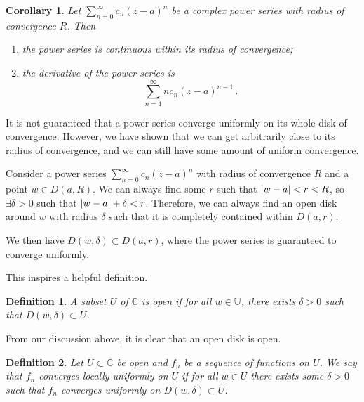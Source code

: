 \documentclass{article}
\theoremstyle{plain}\theoremheaderfont{\normalfont\itshape}\theorembodyfont{\rmfamily}\theoremseparator{.}\newtheorem*{rem}{Remark}\newtheorem*{ex}{Example}\newtheorem*{proof}{Proof}\newtheorem*{altp}{Alternative proof}
\theoremstyle{plain}\theoremheaderfont{\normalfont\bfseries}\theorembodyfont{\rmfamily}\theoremseparator{.}\newtheorem{thm}{Theorem}[section]\newtheorem{lem}[thm]{Lemma}\newtheorem{prop}[thm]{Proposition}\newtheorem*{cor}{Corollary}\newtheorem{defn}[thm]{Definition}\newtheorem{clm}[thm]{Claim}\newtheorem{clminproof}{Claim}
\theoremstyle{break}\theoremheaderfont{\normalfont\itshape}\theorembodyfont{\rmfamily}\theoremseparator{.\medskip}\newtheorem*{proofskip}{Proof}\newtheorem*{exs}{Examples}\newtheorem*{rems}{Remarks}
\theoremstyle{break}\theoremheaderfont{\normalfont\bfseries}\theorembodyfont{\rmfamily}\theoremseparator{.\medskip}\newtheorem{lemskip}[thm]{Lemma}\newtheorem{defnskip}[thm]{Definition}\newtheorem{propskip}[thm]{Proposition}\newtheorem{thmskip}[thm]{Theorem}
\begin{document}
    \begin{cor}
        Let \(\sum_{n=0}^{\infty}c_n(z-a)^n\) be a complex power series with radius of convergence \(R\). Then
        \begin{enumerate}[topsep=0pt,label=(\roman*)]
            \item the power series is continuous within its radius of convergence;
            \item the derivative of the power series is
            \[\sum_{n=1}^{\infty}nc_n(z-a)^{n-1}\,.\]
        \end{enumerate}
    \end{cor}

    It is not guaranteed that a power series converge uniformly on its whole disk of convergence. However, we have shown that we can get arbitrarily close to its radius of convergence, and we can still have some amount of uniform convergence.

    Consider a power series \(\sum_{n=0}^{\infty}c_n(z-a)^n\) with radius of convergence \(R\) and a point \(w\in D(a,R)\). We can always find some \(r\) such that \(\abs{w-a}<r<R\), so \(\exists \delta>0\) such that \(\abs{w-a}+\delta<r\). Therefore, we can always find an open disk around \(w\) with radius \(\delta\) such that it is completely contained within \(D(a,r)\).
    \begin{center}
    \end{center}
    We then have \(D(w,\delta)\subset D(a,r)\), where the power series is guaranteed to converge uniformly.

    This inspires a helpful definition.
    \begin{defn}
        A subset \(U\) of \(\mathbb{C}\) is \textit{open} if for all \(w\in\mathbb{U}\), there exists \(\delta>0\) such that \(D(w,\delta)\subset U\).
    \end{defn}
    From our discussion above, it is clear that an open disk is open.
    \begin{defn}
        Let \(U\subset \mathbb{C}\) be open and \(f_n\) be a sequence of functions on \(U\). We say that \(f_n\) \textit{converges locally uniformly} on \(U\) if for all \(w\in U\) there exists some \(\delta>0\) such that \(f_n\) converges uniformly on \(D(w,\delta)\subset U\).
    \end{defn}
\end{document}

